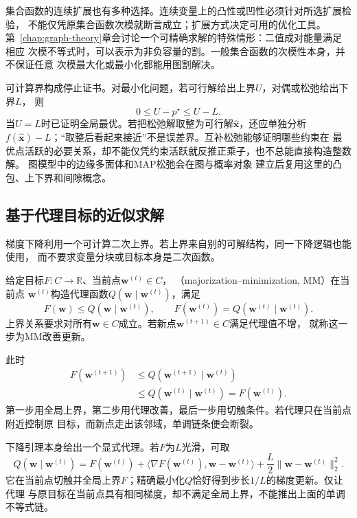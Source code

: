 集合函数的连续扩展也有多种选择。连续变量上的凸性或凹性必须针对所选扩展检验，
不能仅凭原集合函数次模就断言成立；扩展方式决定可用的优化工具。
第~\ref{chap:graph-theory}章会讨论一个可精确求解的特殊情形：二值成对能量满足相应
次模不等式时，可以表示为非负容量的割。一般集合函数的次模性本身，并不保证任意
次模最大化或最小化都能用图割解决。

可计算界构成停止证书。对最小化问题，若可行解给出上界$U$，对偶或松弛给出下界$L$，
则
\[
  0\leq U-p^\star\leq U-L.
\]
当$U=L$时已证明全局最优。若把松弛解取整为可行解$\widehat{\bm{x}}$，还应单独分析
$f(\widehat{\bm{x}})-L$；“取整后看起来接近”不是误差界。互补松弛能够证明哪些约束在
最优点活跃的必要关系，却不能仅凭约束活跃就反推正乘子，也不总能直接构造整数解。
图模型中的边缘多面体和MAP松弛会在图与概率对象
建立后复用这里的凸包、上下界和间隙概念。

\subsection{基于代理目标的近似求解}
\label{sec:opt-majorization-improvement}

梯度下降利用一个可计算二次上界。若上界来自别的可解结构，同一下降逻辑也能使用，
而不要求变量分块或目标本身是二次函数。
\begin{definition}[主化代理与MM更新]
\label{def:opt-majorization-minimization}
给定目标$F:C\to\mathbb R$、当前点$\bm w^{(t)}\in C$，
（majorization--minimization, MM）在当前点
$\bm{w}^{(t)}$构造代理函数$Q(\bm{w}\mid\bm{w}^{(t)})$，满足
\[
  F(\bm{w})\leq Q(\bm{w}\mid\bm{w}^{(t)}),
  \qquad
  F(\bm{w}^{(t)})=Q(\bm{w}^{(t)}\mid\bm{w}^{(t)}).
\]
上界关系要求对所有$\bm w\in C$成立。若新点$\bm w^{(t+1)}\in C$满足代理值不增，
就称这一步为MM改善更新。
\end{definition}
此时
\begin{align*}
  F(\bm{w}^{(t+1)})
  &\leq Q(\bm{w}^{(t+1)}\mid\bm{w}^{(t)})\\
  &\leq Q(\bm{w}^{(t)}\mid\bm{w}^{(t)})
  =F(\bm{w}^{(t)}).
\end{align*}
第一步用全局上界，第二步用代理改善，最后一步用切触条件。若代理只在当前点附近控制原
目标，而新点走出该邻域，单调链条便会断裂。

下降引理本身给出一个显式代理。若$F$为$L$光滑，可取
\[
  Q(\bm{w}\mid\bm{w}^{(t)})
  =F(\bm{w}^{(t)})
  +\langle\nabla F(\bm{w}^{(t)}),\bm{w}-\bm{w}^{(t)}\rangle
  +\frac{L}{2}\lVert\bm{w}-\bm{w}^{(t)}\rVert_2^2.
\]
它在当前点切触并全局上界$F$；精确最小化$Q$恰好得到步长$1/L$的梯度更新。仅让代理
与原目标在当前点具有相同梯度，却不满足全局上界，不能推出上面的单调不等式链。

